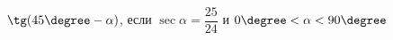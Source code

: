 \begin{ex}[type=simplify_calculate]
	\begin{condition}
		\( \tg(45\degree-\alpha) \), \quad если \( \sec\alpha=\dfrac{25}{24} \) и \( 0\degree<\alpha<90\degree \)
	\end{condition}
\end{ex}